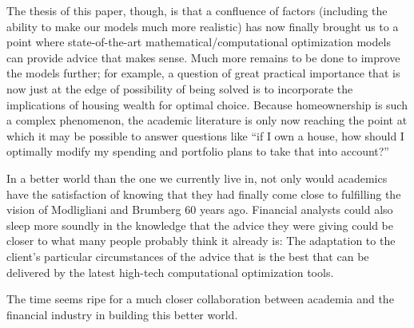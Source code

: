 \documentclass{article}
\begin{document}
The thesis of this paper, though, is that a confluence of factors (including the ability to make our models much more realistic) has now finally brought us to a point where state-of-the-art mathematical/computational optimization models can provide advice that makes sense. Much more remains to be done to improve the models further; for example, a question of great practical importance that is now just at the edge of possibility of being solved is to incorporate the implications of housing wealth for optimal choice. Because homeownership is such a complex phenomenon, the academic literature is only now reaching the point at which it may be possible to answer questions like ``if I own a house, how should I optimally modify my spending and portfolio plans to take that into account?''

In a better world than the one we currently live in, not only would academics have the satisfaction of knowing that they had finally come close to fulfilling the vision of Modligliani and Brumberg 60 years ago. Financial analysts could also sleep more soundly in the knowledge that the advice they were giving could be closer to what many people probably think it already is: The adaptation to the client's particular circumstances of the advice that is the best that can be delivered by the latest high-tech computational optimization tools.

The time seems ripe for a much closer collaboration between academia and the financial industry in building this better world.
\printglossaries






\end{document}

